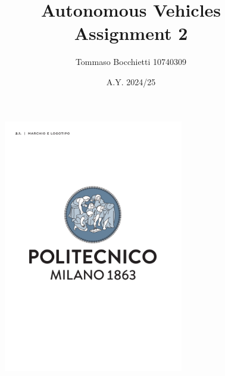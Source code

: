\documentclass{assignment}
\begin{document}
\title{Autonomous Vehicles \\ Assignment 2}
\author{Tommaso Bocchietti 10740309}
\date{A.Y. 2024/25}

\maketitle

\begin{figure}[H]
    \centering
    \includegraphics[width=0.7\textwidth]{./pdf/Polimi_logo_coverpage.pdf}
    \label{fig:Polimi_logo}
\end{figure}

\clearpage
\tableofcontents
\listoffigures

\clearpage






\vspace*{\fill}
\nocite{*}


\end{document}

